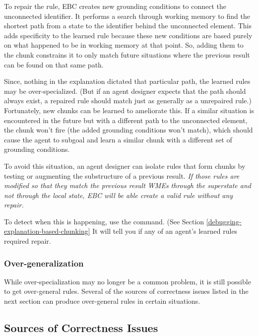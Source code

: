To repair the rule, EBC creates new grounding conditions to connect the unconnected identifier.  It performs a search through working memory to find the shortest path from a state to the identifier behind the unconnected element.   This adds specificity to the learned rule because these new conditions are based purely on what happened to be in working memory at that point.  So, adding them to the chunk constrains it to only match future situations where the previous result can be found on that same path. 

Since, nothing in the explanation dictated that particular path, the learned rules may be over-specialized. (But if an agent designer expects that the path should always exist, a repaired rule should match just as generally as a unrepaired rule.) Fortunately, new chunks can be learned to ameliorate this.  If a similar situation is encountered in the future but with a different path to the unconnected element, the chunk won't fire (the added grounding conditions won't match), which should cause the agent to subgoal and learn a similar chunk with a different set of grounding conditions.

To avoid this situation, an agent designer can isolate rules that form chunks by testing or augmenting the substructure of a previous result.  \emph{If those rules are modified so that they match the previous result WMEs through the superstate and not through the local state, EBC will be able create a valid rule without any repair.} 

To detect when this is happening, use the  command. (See Section \ref{debugging-explanation-based-chunking} It will tell you if any of an agent's learned rules required repair.

\subsubsection{Over-generalization}

While over-specialization may no longer be a common problem, it is still possible to get over-general rules.  Several of the sources of correctness issues listed in the next section can produce over-general rules in certain situations.


\subsection{Sources of Correctness Issues}
\label{CHUNKING-correctness-issues}

